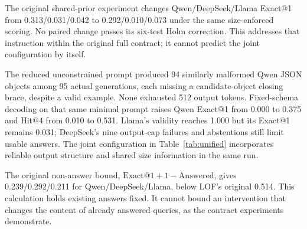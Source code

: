 \documentclass[conference]{IEEEtran}
\begin{document}
The original shared-prior experiment changes Qwen/DeepSeek/Llama Exact@1 from 0.313/0.031/0.042 to 0.292/0.010/0.073 under the same size-enforced scoring. No paired change passes its six-test Holm correction. This addresses that instruction within the original full contract; it cannot predict the joint configuration by itself.

The reduced unconstrained prompt produced 94 similarly malformed Qwen JSON objects among 95 actual generations, each missing a candidate-object closing brace, despite a valid example. None exhausted 512 output tokens. Fixed-schema decoding on that same minimal prompt raises Qwen Exact@1 from 0.000 to 0.375 and Hit@4 from 0.010 to 0.531. Llama's validity reaches 1.000 but its Exact@1 remains 0.031; DeepSeek's nine output-cap failures and abstentions still limit usable answers. The joint configuration in Table~\ref{tab:unified} incorporates reliable output structure and shared size information in the same run.

The original non-answer bound, $\mathrm{Exact@1}+1-\mathrm{Answered}$, gives 0.239/0.292/0.211 for Qwen/DeepSeek/Llama, below LOF's original 0.514. This calculation holds existing answers fixed. It cannot bound an intervention that changes the content of already answered queries, as the contract experiments demonstrate.
\end{document}

